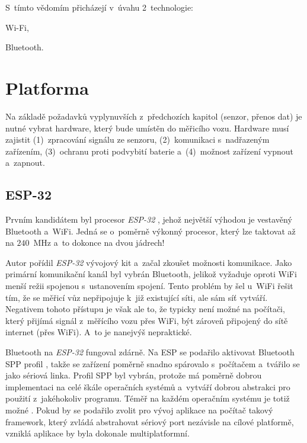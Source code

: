S~tímto vědomím přicházejí v~úvahu 2~technologie:

\begin{compactenum}
\item Wi-Fi,
\item Bluetooth.
\end{compactenum}

\section{Platforma}
\label{sec:wsm-platforma}

Na základě požadavků vyplynuvších z~předchozích kapitol (senzor, přenos dat)
je nutné vybrat hardware, který bude umístěn do měřicího vozu. Hardware
musí zajistit (1)~zpracování signálu ze senzoru, (2)~komunikaci s~nadřazeným
zařízením, (3)~ochranu proti podvybití baterie a~(4)~možnost zařízení vypnout
a~zapnout.

\subsection{ESP-32}
\label{subsec:wsm-esp32}

Prvním kandidátem byl procesor \textit{ESP-32} \cite{esp-32}, jehož největší
výhodou je vestavěný Bluetooth a~WiFi. Jedná se o~poměrně výkonný procesor,
který lze taktovat až na $240$~MHz a~to dokonce na dvou jádrech!
\cite{esp-32:datasheet}

Autor pořídil \textit{ESP-32} vývojový kit a~začal zkoušet možnosti komunikace. Jako
primární komunikační kanál byl vybrán Bluetooth, jelikož vyžaduje oproti WiFi
menší režii spojenou s~ustanovením spojení. Tento problém by šel u~WiFi řešit
tím, že se měřicí vůz nepřipojuje k~již existující síti, ale sám síť vytváří.
Negativem tohoto přístupu je však ale to, že typicky není možné na počítači,
který přijímá signál z~měřícího vozu přes WiFi, být zároveň připojený do sítě
internet (přes WiFi). A~to je nanejvýš nepraktické.

Bluetooth na \textit{ESP-32} fungoval zdárně. Na ESP se podařilo aktivovat
Bluetooth \gls{SPP} profil \cite{spp:specs}, takže se zařízení poměrně snadno
spárovalo s~počítačem a~tvářilo se jako sériová linka. Profil \gls{SPP} byl
vybrán, protože má poměrně dobrou implementaci na celé škále operačních systémů
a~vytváří dobrou abstrakci pro použití z~jakéhokoliv programu. Téměř na každém
operačním systému je totiž možné . Pokud by se
podařilo zvolit pro vývoj aplikace na počítač takový framework, který zvládá
abstrahovat sériový port nezávisle na cílové platformě, vzniklá aplikace by
byla dokonale multiplatformní.

